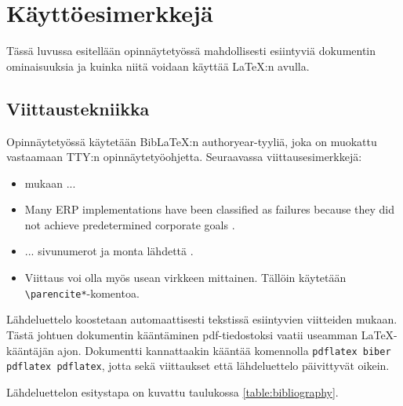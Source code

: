 \chapter{Käyttöesimerkkejä}

Tässä luvussa esitellään opinnäytetyössä mahdollisesti esiintyviä dokumentin ominaisuuksia ja kuinka niitä voidaan käyttää \LaTeX:n avulla. 

\section{Viittaustekniikka}

Opinnäytetyössä käytetään BibLaTeX:n authoryear-tyyliä, joka on muokattu vastaamaan TTY:n opinnäytetyöohjetta. Seuraavassa viittausesimerkkejä:

\begin{itemize}
	\item \textcite[ss.~32--34]{lehman2014biblatex} mukaan ...
	\item Many ERP implementations have been classified as failures because they did not achieve predetermined corporate goals \cite{umble2003enterprise}.
	\item ... sivunumerot ja monta lähdettä \cites[12]{lehman2014biblatex}[1]{knuth1973fundamental}.
	\item Viittaus voi olla myös usean virkkeen mittainen. Tällöin käytetään \verb+\parencite*+-komentoa. \cite*{somers2001impact}
\end{itemize}

Lähdeluettelo koostetaan automaattisesti tekstissä esiintyvien viitteiden mukaan.
Tästä johtuen dokumentin kääntäminen pdf-tiedostoksi vaatii useamman \LaTeX-kääntäjän ajon.
Dokumentti kannattaakin kääntää komennolla \texttt{pdflatex biber pdflatex pdflatex}, jotta sekä viittaukset että lähdeluettelo päivittyvät oikein.

Lähdeluettelon esitystapa on kuvattu taulukossa \ref{table:bibliography}.

